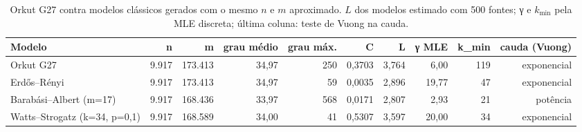 \begin{table}[!htb]
\centering
\caption{Orkut G27 contra modelos clássicos gerados com o mesmo $n$ e $m$ aproximado. $L$ dos modelos estimado com 500 fontes; γ e $k_{\min}$ pela MLE discreta; última coluna: teste de Vuong na cauda.}
\label{tab:modelos}
\begin{adjustbox}{max width=\linewidth}
\begin{tabular}{lrrrrrrrrr}
\toprule
Modelo & n & m & grau médio & grau máx. & C & L & γ MLE & k\_min & cauda (Vuong) \\
\midrule
Orkut G27 & 9.917 & 173.413 & 34,97 & 250 & 0,3703 & 3,764 & 6,00 & 119 & exponencial \\
Erdős–Rényi & 9.917 & 173.413 & 34,97 & 59 & 0,0035 & 2,896 & 19,77 & 47 & exponencial \\
Barabási–Albert (m=17) & 9.917 & 168.436 & 33,97 & 568 & 0,0171 & 2,807 & 2,93 & 21 & potência \\
Watts–Strogatz (k=34, p=0,1) & 9.917 & 168.589 & 34,00 & 41 & 0,5307 & 3,597 & 20,00 & 34 & exponencial \\
\bottomrule
\end{tabular}
\end{adjustbox}
\end{table}
